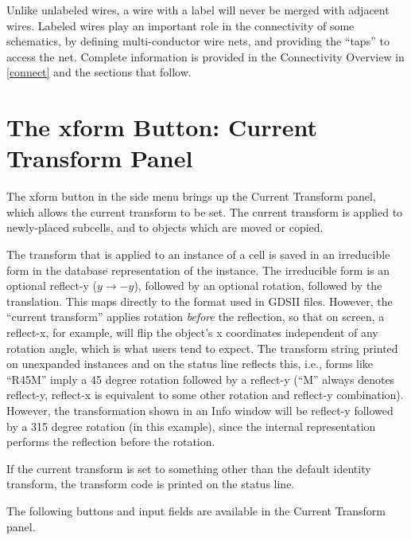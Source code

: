 Unlike unlabeled wires, a wire with a label will never be merged with
adjacent wires.  Labeled wires play an important role in the
connectivity of some schematics, by defining multi-conductor wire
nets, and providing the ``taps'' to access the net.  Complete
information is provided in the Connectivity Overview in \ref{connect}
and the sections that follow.


\section{The {\cb xform} Button: Current Transform Panel}
\label{curxform}

The {\cb xform} button in the side menu brings up the {\cb Current
Transform} panel, which allows the current transform to be set.  The
current transform is applied to newly-placed subcells, and to objects
which are moved or copied.

The transform that is applied to an instance of a cell is saved in an
irreducible form in the database representation of the instance.  The
irreducible form is an optional reflect-y ($y \rightarrow -y$),
followed by an optional rotation, followed by the translation.  This
maps directly to the format used in GDSII files.  However, the
``current transform'' applies rotation {\it before} the reflection, so
that on screen, a reflect-x, for example, will flip the object's x
coordinates independent of any rotation angle, which is what users
tend to expect.  The transform string printed on unexpanded instances
and on the status line reflects this, i.e., forms like ``{\vt R45M}''
imply a 45 degree rotation followed by a reflect-y (``{\vt M}'' always
denotes reflect-y, reflect-x is equivalent to some other rotation and
reflect-y combination).  However, the transformation shown in an {\cb
Info} window will be reflect-y followed by a 315 degree rotation (in
this example), since the internal representation performs the
reflection before the rotation.

If the current transform is set to something other than the default
identity transform, the transform code is printed on the status line.

The following buttons and input fields are available in the
{\cb Current Transform} panel.

